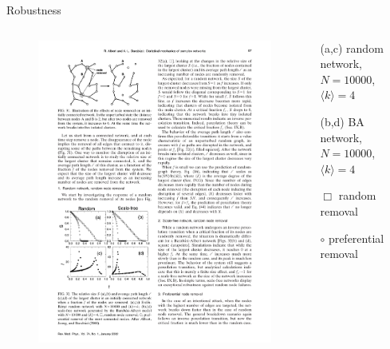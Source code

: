 \begin{frame}{Robustness}
	
\begin{columns}
\begin{column}{0.65\textwidth}
\begin{figure}
	\includegraphics[width=\textwidth]{robustness2.pdf}
\end{figure}
\end{column}
\begin{column}{0.32\textwidth}
\BI
\item[(a,c)] random network, $N=10000$, $\langle k \rangle = 4$
\item[(b,d)] BA network, $N=10000$, $\langle k \rangle = 4$
\EI

\bigskip
\BI
\item[$\Box$] random removal\\
\item[$\circ$] preferential removal
\EI
\end{column}
\end{columns}




\end{frame}
